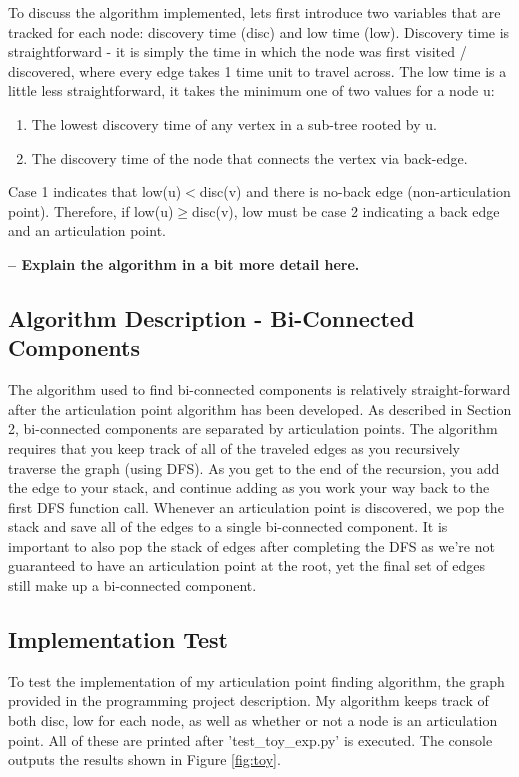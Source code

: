 \documentclass[]{article}
\begin{document}
To discuss the algorithm implemented, lets first introduce two variables that are tracked for each node: discovery time (disc) and low time (low). Discovery time is straightforward - it is simply the time in which the node was first visited / discovered, where every edge takes 1 time unit to travel across. The low time is a little less straightforward, it takes the minimum one of two values for a node u:
\begin{enumerate}
	\item The lowest discovery time of any vertex in a sub-tree rooted by u.
	\item The discovery time of the node that connects the vertex via back-edge.
\end{enumerate}

Case 1 indicates that low(u)$<$disc(v) and there is no-back edge (non-articulation point). Therefore, if low(u)$\geq$disc(v), low must be case 2 indicating a back edge and an articulation point.

\textbf{-- Explain the algorithm in a bit more detail here.}

\subsection{Algorithm Description - Bi-Connected Components}
The algorithm used to find bi-connected components is relatively straight-forward after the articulation point algorithm has been developed. As described in Section 2, bi-connected components are separated by articulation points. The algorithm requires that you keep track of all of the traveled edges as you recursively traverse the graph (using DFS). As you get to the end of the recursion, you add the edge to your stack, and continue adding as you work your way back to the first DFS function call. Whenever an articulation point is discovered, we pop the stack and save all of the edges to a single bi-connected component. It is important to also pop the stack of edges after completing the DFS as we're not guaranteed to have an articulation point at the root, yet the final set of edges still make up a bi-connected component.

\subsection{Implementation Test}
To test the implementation of my articulation point finding algorithm, the graph provided in the programming project description. My algorithm keeps track of both disc, low for each node, as well as whether or not a node is an articulation point. All of these are printed after 'test\_toy\_exp.py' is executed. The console outputs the results shown in Figure \ref{fig:toy}.
\end{document}
